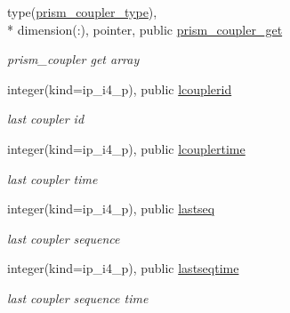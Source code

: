 \begin{DoxyCompactItemize}
type(\hyperlink{structmod__oasis__coupler_1_1prism__coupler__type}{prism\+\_\+coupler\+\_\+type}), \\*
dimension(\+:), pointer, public \hyperlink{classmod__oasis__coupler_a96df3ef2ec1b53597bb9beca43fe8349}{prism\+\_\+coupler\+\_\+get}
\begin{DoxyCompactList}\small\item\em prism\+\_\+coupler get array \end{DoxyCompactList}\item 
integer(kind=ip\+\_\+i4\+\_\+p), public \hyperlink{classmod__oasis__coupler_a2e4d905b50abb50cea9382a8b58e3e0c}{lcouplerid}
\begin{DoxyCompactList}\small\item\em last coupler id \end{DoxyCompactList}\item 
integer(kind=ip\+\_\+i4\+\_\+p), public \hyperlink{classmod__oasis__coupler_a477b53431b7aa1d2b311a78e5db7f00f}{lcouplertime}
\begin{DoxyCompactList}\small\item\em last coupler time \end{DoxyCompactList}\item 
integer(kind=ip\+\_\+i4\+\_\+p), public \hyperlink{classmod__oasis__coupler_a0cb9b8a96c10385d38fa244d920c7eaf}{lastseq}
\begin{DoxyCompactList}\small\item\em last coupler sequence \end{DoxyCompactList}\item 
integer(kind=ip\+\_\+i4\+\_\+p), public \hyperlink{classmod__oasis__coupler_a47f4727f94719892d837f6a1545d3d08}{lastseqtime}
\begin{DoxyCompactList}\small\item\em last coupler sequence time \end{DoxyCompactList}\end{DoxyCompactItemize}
